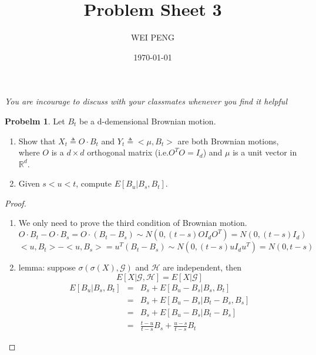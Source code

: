 \documentclass{article}     %
\title{Problem Sheet 3}  %
\author{WEI PENG}      %
\date{\today}      %
\begin{document}
\maketitle                   %

\emph{You are incourage to discuss with your classmates whenever you find it helpful}

\noindent
\textbf{Probelm 1}. Let $B_t$ be a d-demensional Brownian motion.
\begin{enumerate}[(1)]
    \item Show that $X_t\triangleq O\cdot B_t$ and $Y_t\triangleq<\mu,B_t>$ are both Brownian motions, where $O$ is a $d\times d$ orthogonal matrix (i.e.$ O^TO=I_d$) and $\mu$ is a unit vector in $\mathbb{R}^d$.
    \item Given $s<u<t$, compute $E[B_{u}|B_s,B_t]$.
\end{enumerate}


\begin{proof}
\begin{enumerate}[(1)]
\item We only need to prove the third condition of Brownian motion.
\[O\cdot B_t-O\cdot B_s=O\cdot(B_t-B_s)\sim N(0,(t-s)OI_dO^T)=N(0,(t-s)I_d)\]
\[<u,B_t>-<u,B_s>=u^T(B_t-B_s)\sim N(0, (t-s)uI_du^T)=N(0,t-s)\]
\item  lemma: suppose $\sigma(\sigma(X),\mathcal{G})$ and $\mathcal{H}$ are 
independent, then \[E[X|\mathcal{G},\mathcal{H}] =E[X|\mathcal{G}]\]
 \begin{eqnarray*}
  E[B_u|B_s,B_t] & = & B_s+E[B_u-B_s|B_s,B_t]\\ 
    & = & B_s+E[B_u-B_s|B_t-B_s,B_s]\\ 
    & = & B_s+ E[B_u- B_s|B_t-B_s]\\ 
    & = & \frac{t-u}{t-s}B_s+\frac{u-s}{t-s}B_t
    \end{eqnarray*}
\end{enumerate}
\end{proof}
\end{document}
